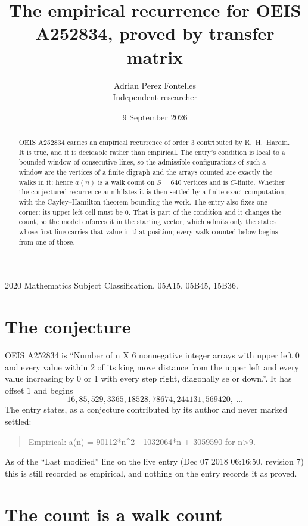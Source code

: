 \documentclass[11pt,a4paper]{article}
\title{The empirical recurrence for OEIS A252834, proved by transfer matrix}
\author{Adrian Perez Fontelles\\ \small Independent researcher}
\date{9 September 2026}
\theoremstyle{plain}
\theoremstyle{definition}
\begin{document}
\maketitle

\begin{abstract}
OEIS A252834 carries an empirical recurrence of order $3$ contributed by R.~H.~Hardin. It is
true, and it is decidable rather than empirical. The entry's condition is local to a bounded window of consecutive lines, so
the admissible configurations of such a window are the vertices of a finite digraph and the
arrays counted are exactly the walks in it; hence $a(n)$ is a walk count on $S=640$ vertices
and is $C$-finite. Whether the conjectured recurrence annihilates it is then settled by a
finite exact computation, with the Cayley--Hamilton theorem bounding the work.
 The entry also fixes one corner: its upper left cell must be $0$. That is part of the condition and it changes the count, so the model enforces it in the starting vector, which admits only the states whose first line carries that value in that position; every walk counted below begins from one of those.\end{abstract}

\noindent\small 2020 Mathematics Subject Classification. 05A15, 05B45, 15B36.\normalsize

\section{The conjecture}

OEIS A252834 is ``Number of n X 6 nonnegative integer arrays with upper left 0 and every value within 2 of its king move distance from the upper left and every value increasing by 0 or 1 with every step right, diagonally se or down.''. It has offset $1$ and begins
\[
16, 85, 529, 3365, 18528, 78674, 244131, 569420,\ \dots
\]
The entry states, as a conjecture contributed by its author and never marked settled:
\begin{quote}
Empirical: a(n) = 90112*n\^{}2 - 1032064*n + 3059590 for n>9.
\end{quote}
As of the ``Last modified'' line on the live entry (Dec 07 2018 06:16:50, revision 7) this is still
recorded as empirical, and nothing on the entry records it as proved.

\section{The count is a walk count}
\end{document}
